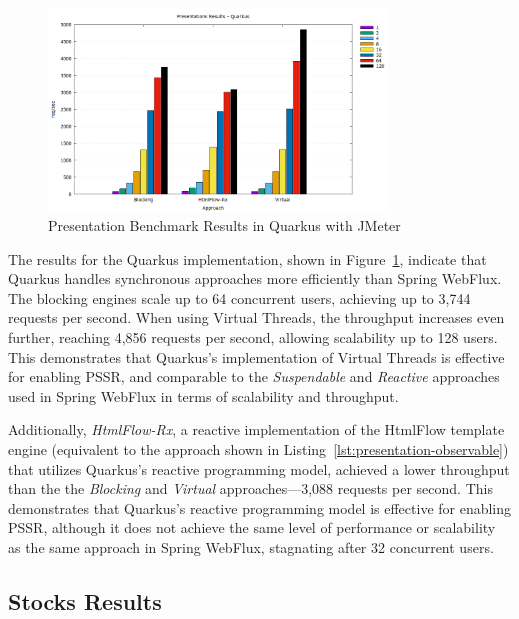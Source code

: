 \begin{figure}[h]
     \centering
     \includegraphics[width=0.8\textwidth]{./Graphs/presentations-quarkus-jmeter.png}
     \caption{Presentation Benchmark Results in Quarkus with JMeter}\label{fig:presentations-quarkus-jmeter}
\end{figure}

The results for the Quarkus implementation, shown in
Figure~\ref{fig:presentations-quarkus-jmeter}, indicate that Quarkus handles
synchronous approaches more efficiently than Spring WebFlux. The blocking
engines scale up to 64 concurrent users, achieving up to 3,744 requests per
second. When using Virtual Threads, the throughput increases even further,
reaching 4,856 requests per second, allowing scalability up to 128 users. This
demonstrates that Quarkus's implementation of Virtual Threads is effective for
enabling PSSR\@, and comparable to the \textit{Suspendable} and
\textit{Reactive} approaches used in Spring WebFlux in terms of scalability and
throughput.

Additionally, \textit{HtmlFlow-Rx}, a reactive implementation of the HtmlFlow
template engine (equivalent to the approach shown in
Listing~\ref{lst:presentation-observable}) that utilizes Quarkus's reactive
programming model, achieved a lower throughput than the the \textit{Blocking}
and \textit{Virtual} approaches—3,088 requests per second. This demonstrates
that Quarkus's reactive programming model is effective for enabling PSSR\@,
although it does not achieve the same level of performance or scalability as
the same approach in Spring WebFlux, stagnating after 32 concurrent users.

\subsection{Stocks Results}

